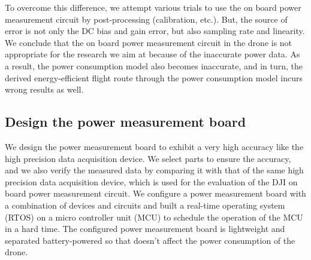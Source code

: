\documentclass[journal]{./template/IEEEtran}
\begin{document}
To overcome this difference, we attempt various trials to use the on board power measurement circuit by post-processing (calibration, etc.). But, the source of error is not only the DC bias and gain error, but also sampling rate and linearity. 
We conclude that the on board power measurement circuit in the drone is not appropriate for the research we aim at because of the inaccurate power data. 
As a result, the power consumption model also becomes inaccurate, and in turn, the derived energy-efficient flight route through the power consumption model incurs wrong results as well.





\subsection{Design the power measurement board}
We design the power measurement board to exhibit a very high accuracy like the high precision data acquisition device. 
We select parts to ensure the accuracy, and we also verify the measured data by comparing it with that of the same high precision data acquisition device, which is used for the evaluation of the DJI on board power measurement circuit.
We configure a power measurement board with a combination of devices and circuits and built a real-time operating system (RTOS) on a micro controller unit (MCU) to schedule the operation of the MCU in a hard time. 
The configured power measurement board is lightweight and separated battery-powered so that doesn't affect the power consumption of the drone.
\end{document}
